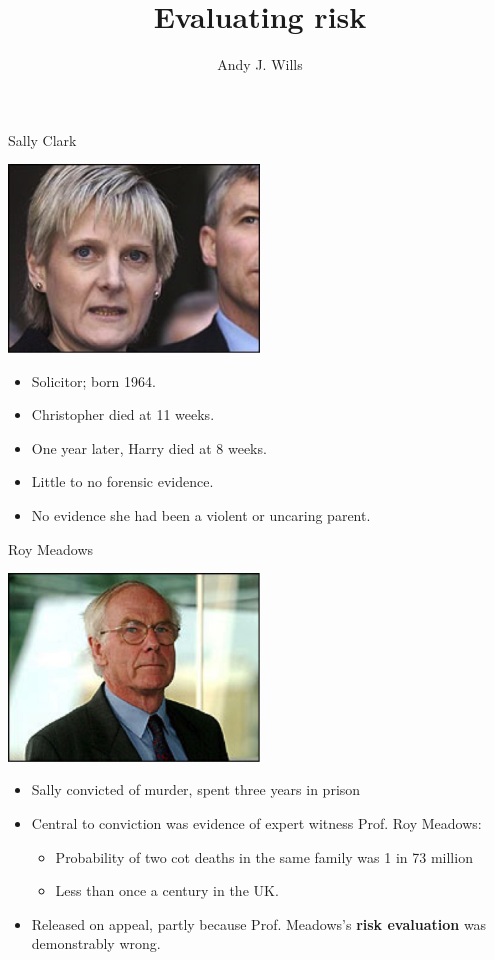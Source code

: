 \documentclass{beamer}
\title{Evaluating risk}
\author{Andy J. Wills}
\date{}
\begin{document}
\frame{\titlepage}

\begin{frame}{Sally Clark}
\centerline{\includegraphics[width=0.5\textwidth]{pics/sallyclark.png}}
\begin{itemize}
\item Solicitor; born 1964.
\item Christopher died at 11 weeks.
\item One year later, Harry died at 8 weeks.
\item Little to no forensic evidence.
\item No evidence she had been a violent or uncaring parent.
\end{itemize}
\end{frame}

\begin{frame}{Roy Meadows}
\centerline{\includegraphics[width=0.5\textwidth]{pics/roymeadows.png}}
\begin{itemize}
\item Sally convicted of murder, spent three years in prison
\item Central to conviction was evidence of expert witness Prof. Roy Meadows:
\begin{itemize}
\item Probability of two cot deaths in the same family was 1 in 73 million
\item Less than once a century in the UK.
\end{itemize}
\item Released on appeal, partly because Prof. Meadows's \textbf{risk
    evaluation} was demonstrably wrong.
\end{itemize}
\end{frame}
\end{document}
